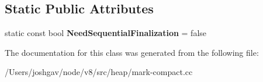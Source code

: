 \subsection*{Static Public Attributes}
\begin{DoxyCompactItemize}
\item 
static const bool {\bfseries Need\+Sequential\+Finalization} = false\hypertarget{classv8_1_1internal_1_1_to_space_pointer_update_job_traits_af0084f125c8a0701d58faae57a60450b}{}\label{classv8_1_1internal_1_1_to_space_pointer_update_job_traits_af0084f125c8a0701d58faae57a60450b}

\end{DoxyCompactItemize}


The documentation for this class was generated from the following file\+:\begin{DoxyCompactItemize}
\item 
/\+Users/joshgav/node/v8/src/heap/mark-\/compact.\+cc\end{DoxyCompactItemize}

